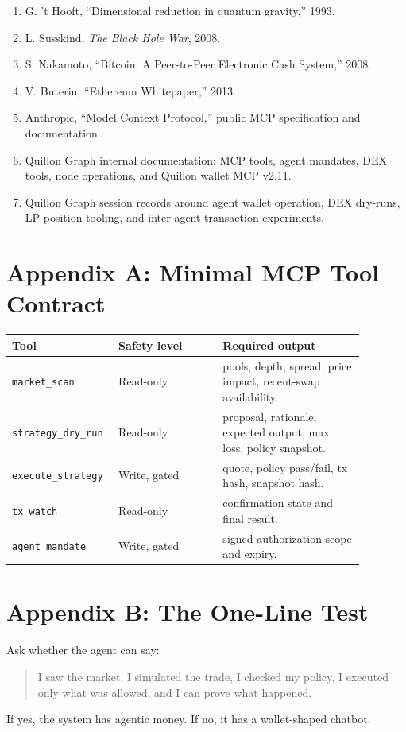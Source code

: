 \documentclass[11pt,a4paper]{article}
\begin{document}
\begin{enumerate}[leftmargin=1.2cm]
  \item G. 't Hooft, ``Dimensional reduction in quantum gravity,'' 1993.
  \item L. Susskind, \emph{The Black Hole War}, 2008.
  \item S. Nakamoto, ``Bitcoin: A Peer-to-Peer Electronic Cash System,'' 2008.
  \item V. Buterin, ``Ethereum Whitepaper,'' 2013.
  \item Anthropic, ``Model Context Protocol,'' public MCP specification and documentation.
  \item Quillon Graph internal documentation: MCP tools, agent mandates, DEX tools, node operations, and Quillon wallet MCP v2.11.
  \item Quillon Graph session records around agent wallet operation, DEX dry-runs, LP position tooling, and inter-agent transaction experiments.
\end{enumerate}

\section*{Appendix A: Minimal MCP Tool Contract}

\begin{longtable}{p{0.22\linewidth}p{0.28\linewidth}p{0.38\linewidth}}
\toprule
\textbf{Tool} & \textbf{Safety level} & \textbf{Required output} \\
\midrule
\texttt{market\_scan} & Read-only & pools, depth, spread, price impact, recent-swap availability. \\
\texttt{strategy\_dry\_run} & Read-only & proposal, rationale, expected output, max loss, policy snapshot. \\
\texttt{execute\_strategy} & Write, gated & quote, policy pass/fail, tx hash, snapshot hash. \\
\texttt{tx\_watch} & Read-only & confirmation state and final result. \\
\texttt{agent\_mandate} & Write, gated & signed authorization scope and expiry. \\
\bottomrule
\end{longtable}

\section*{Appendix B: The One-Line Test}

Ask whether the agent can say:

\begin{quote}
I saw the market, I simulated the trade, I checked my policy, I executed only what was allowed, and I can prove what happened.
\end{quote}

If yes, the system has agentic money. If no, it has a wallet-shaped chatbot.
\end{document}
